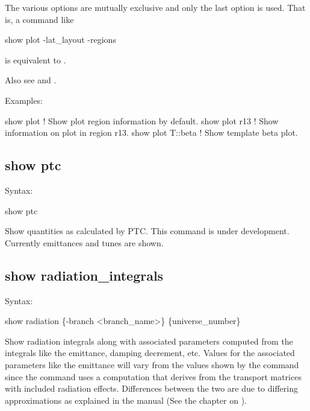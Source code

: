 {{{{{{{{{The various  options are mutually exclusive and only the last option is used. That is,
a command like
\begin{example}
  show plot -lat_layout -regions
\end{example}
is equivalent to .

Also see  and .

Examples:
\begin{example}
  show plot         ! Show plot region information by default.
  show plot r13     ! Show information on plot in region r13.
  show plot T::beta ! Show template beta plot.
\end{example}


\subsection{show ptc}
\label{s:show.ptc}

Syntax:
\begin{example}
  show ptc 
\end{example}

Show quantities as calculated by PTC. This command is under development. Currently emittances and
tunes are shown.


\subsection{show radiation_integrals}
\label{s:show.rad.int}

Syntax:
\begin{example}
  show radiation \{-branch <branch_name>\} \{universe_number\}
\end{example}

Show radiation integrals along with associated parameters computed from the integrals like the
emittance, damping decrement, etc. Values for the associated parameters like the emittance will vary
from the values shown by the  command since the  command uses a
computation that derives from the transport matrices with included radiation effects. Differences
between the two are due to differing approximations as explained in the \bmad manual (See the
chapter on ).

}}}}}}}}}
